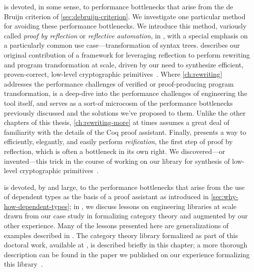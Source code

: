  is devoted, in some sense, to performance bottlenecks that arise from the de Bruijn criterion of \autoref{sec:debruijn-criterion}.
We investigate one particular method for avoiding these performance bottlenecks.
We introduce this method, variously called \emph{proof by reflection} or \emph{reflective automation}, in , with a special emphasis on a particularly common use case---transformation of syntax trees.
 describes our original contribution of a framework for leveraging reflection to perform rewriting and program transformation at scale, driven by our need to synthesize efficient, proven-correct, low-level cryptographic primitives~\cite{FiatCryptoSP19}.
%
Where \autoref{ch:rewriting} addresses the performance challenges of verified or proof-producing program transformation,  is a deep-dive into the performance challenges of engineering the tool itself, and serves as a sort-of microcosm of the performance bottlenecks previously discussed and the solutions we've proposed to them.
Unlike the other chapters of this thesis, \autoref{ch:rewriting-more} at times assumes a great deal of familiarity with the details of the Coq proof assistant.
Finally,  presents a way to efficiently, elegantly, and easily perform \emph{reification}, the first step of proof by reflection, which is often a bottleneck in its own right.
We discovered---or invented---this trick in the course of working on our library for synthesis of low-level cryptographic primitives~\cite{FiatCryptoSP19,reification-by-parametricity}.

 is devoted, by and large, to the performance bottlenecks that arise from the use of dependent types as the basis of a proof assistant as introduced in \autoref{sec:why-how-dependent-types};
in , we discuss lessons on engineering libraries at scale drawn from our case study in formalizing category theory %
and augmented by our other experience.
Many of the lessons presented here are generalizations of examples described in .
The category theory library formalized as part of this doctoral work, available at \textcite{HoTT/HoTT-categories}, is described briefly in this chapter; a more thorough description can be found in the paper we published on our experience formalizing this library~\cite{category-coq-experience}.

